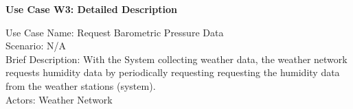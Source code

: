 \documentclass[letterpaper]{article}
\begin{document}
\noindent
\begin{center}
\textbf{Use Case W3:  Detailed Description}
\end{center}
\vspace{4ex}
Use Case Name:  Request Barometric Pressure Data\\
Scenario:  N/A\\
Brief Description:  With the System collecting weather data, the
weather network requests humidity data by periodically requesting
requesting the humidity data from the weather stations (system).\\
Actors:  Weather Network\\\\
\end{document}
